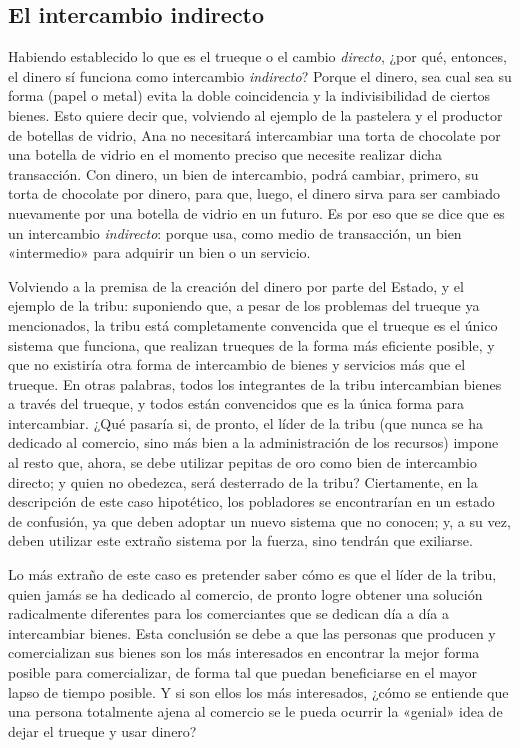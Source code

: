 \documentclass[12pt,a4paper,twoside]{book}
\begin{document}
\subsection{El intercambio indirecto}
Habiendo establecido lo que es el trueque o el cambio \textit{directo}, ¿por qué, entonces, el dinero sí funciona como intercambio \textit{indirecto}? Porque el dinero, sea cual sea su forma (papel o metal) evita la doble coincidencia y la indivisibilidad de ciertos bienes. Esto quiere decir que, volviendo al ejemplo de la pastelera y el productor de botellas de vidrio, Ana no necesitará intercambiar una torta de chocolate por una botella de vidrio en el momento preciso que necesite realizar dicha transacción. Con dinero, un bien de intercambio, podrá cambiar, primero, su torta de chocolate por dinero, para que, luego, el dinero sirva para ser cambiado nuevamente por una botella de vidrio en un futuro. Es por eso que se dice que es un intercambio \textit{indirecto}: porque usa, como medio de transacción, un bien «intermedio» para adquirir un bien o un servicio.

Volviendo a la premisa de la creación del dinero por parte del Estado, y el ejemplo de la tribu: suponiendo que, a pesar de los problemas del trueque ya mencionados, la tribu está completamente convencida que el trueque es el único sistema que funciona, que realizan trueques de la forma más eficiente posible, y que no existiría otra forma de intercambio de bienes y servicios más que el trueque. En otras palabras, todos los integrantes de la tribu intercambian bienes a través del trueque, y todos están convencidos que es la única forma para intercambiar. ¿Qué pasaría si, de pronto, el líder de la tribu (que nunca se ha dedicado al comercio, sino más bien a la administración de los recursos) impone al resto que, ahora, se debe utilizar pepitas de oro como bien de intercambio directo; y quien no obedezca, será desterrado de la tribu? Ciertamente, en la descripción de este caso hipotético, los pobladores se encontrarían en un estado de confusión, ya que deben adoptar un nuevo sistema que no conocen; y, a su vez, deben utilizar este extraño sistema por la fuerza, sino tendrán que exiliarse.

Lo más extraño de este caso es pretender saber cómo es que el líder de la tribu, quien jamás se ha dedicado al comercio, de pronto logre obtener una solución radicalmente diferentes para los comerciantes que se dedican día a día a intercambiar bienes. Esta conclusión se debe a que las personas que producen y comercializan sus bienes son los más interesados en encontrar la mejor forma posible para comercializar, de forma tal que puedan beneficiarse en el mayor lapso de tiempo posible. Y si son ellos los más interesados, ¿cómo se entiende que una persona totalmente ajena al comercio se le pueda ocurrir la «genial» idea de dejar el trueque y usar dinero?
\end{document}
